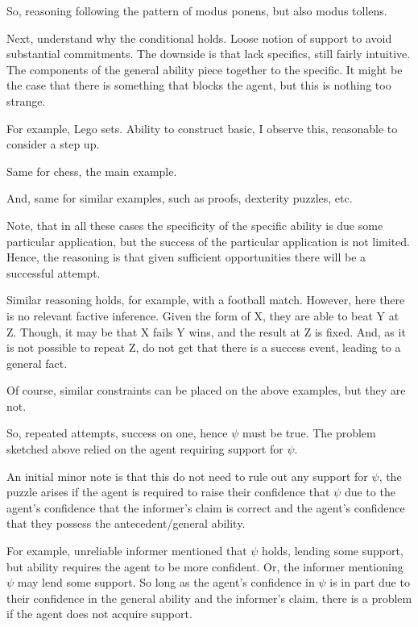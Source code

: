 \documentclass[10pt]{article}
\begin{document}
So, reasoning following the pattern of modus ponens, but also modus tollens.

Next, understand why the conditional holds.
Loose notion of support to avoid substantial commitments.
The downside is that lack specifics, still fairly intuitive.
The components of the general ability piece together to the specific.
It might be the case that there is something that blocks the agent, but this is nothing too strange.

For example, Lego sets.
Ability to construct basic, I observe this, reasonable to consider a step up.

Same for chess, the main example.

And, same for similar examples, such as proofs, dexterity puzzles, etc.

Note, that in all these cases the specificity of the specific ability is due some particular application, but the success of the particular application is not limited.
Hence, the reasoning is that given sufficient opportunities there will be a successful attempt.

Similar reasoning holds, for example, with a football match.
However, here there is no relevant factive inference.
Given the form of X, they are able to beat Y at Z.
Though, it may be that X fails Y wins, and the result at Z is fixed.
And, as it is not possible to repeat Z, do not get that there is a success event, leading to a general fact.

Of course, similar constraints can be placed on the above examples, but they are not.

So, repeated attempts, success on one, hence \(\psi\) must be true.
The problem sketched above relied on the agent requiring support for \(\psi\).

An initial minor note is that this do not need to rule out any support for \(\psi\), the puzzle arises if the agent is required to raise their confidence that \(\psi\) due to the agent's confidence that the informer's claim is correct and the agent's confidence that they possess the antecedent/general ability.

For example, unreliable informer mentioned that \(\psi\) holds, lending some support, but ability requires the agent to be more confident.
Or, the informer mentioning \(\psi\) may lend some support.
So long as the agent's confidence in \(\psi\) is in part due to their confidence in the general ability and the informer's claim, there is a problem if the agent does not acquire support.
\end{document}
